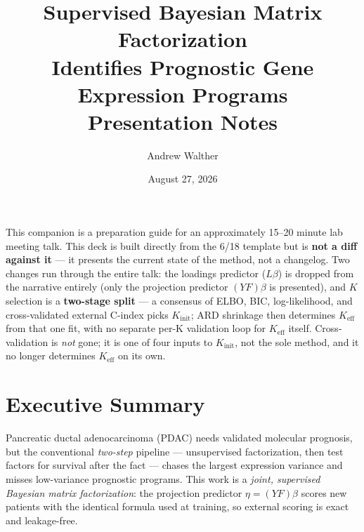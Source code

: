 \documentclass[11pt]{article}
\title{Supervised Bayesian Matrix Factorization\\Identifies Prognostic Gene Expression Programs\\[0.8em]\large Presentation Notes}
\author{Andrew Walther}
\date{August 27, 2026}
\newcommand{\key}[1]{\textcolor{keyblue}{\textbf{#1}}}        %
\begin{document}
\maketitle

\noindent This companion is a preparation guide for an approximately 15--20 minute lab meeting talk.
This deck is built directly from the 6/18 template but is \key{not a diff against it} --- it presents
the current state of the method, not a changelog. Two changes run through the entire talk: the
loadings predictor ($L\beta$) is dropped from the narrative entirely (only the projection predictor
$(YF)\beta$ is presented), and $K$ selection is a \key{two-stage split} --- a consensus of ELBO, BIC,
log-likelihood, and cross-validated external C-index picks $K_\text{init}$; ARD shrinkage then
determines $K_\text{eff}$ from that one fit, with no separate per-K validation loop for $K_\text{eff}$
itself. Cross-validation is \emph{not} gone; it is one of four inputs to $K_\text{init}$, not the sole
method, and it no longer determines $K_\text{eff}$ on its own.

\section*{Executive Summary}

Pancreatic ductal adenocarcinoma (PDAC) needs validated molecular prognosis, but the conventional
\emph{two-step} pipeline --- unsupervised factorization, then test factors for survival after the fact
--- chases the largest expression variance and misses low-variance prognostic programs. This work is a
\emph{joint, supervised Bayesian matrix factorization}: the projection predictor $\eta = (YF)\beta$
scores new patients with the identical formula used at training, so external scoring is exact and
leakage-free.
\end{document}
